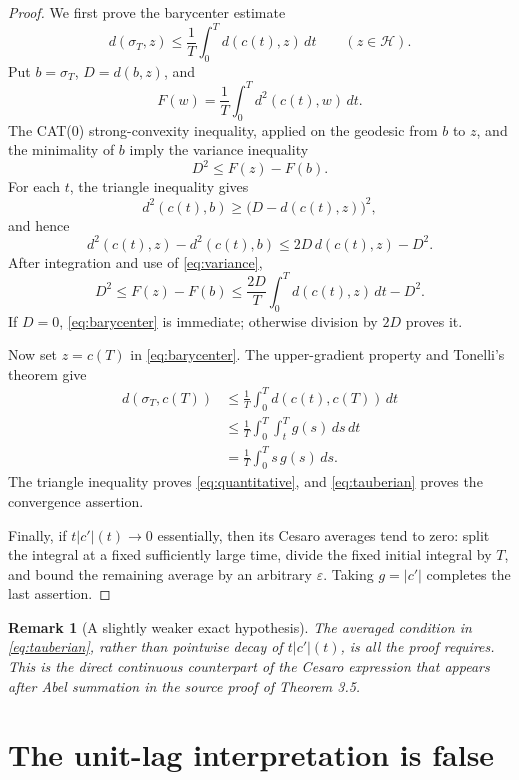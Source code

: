 \documentclass[11pt]{article}
\newtheorem{remark}{Remark}
\newcommand{\Hh}{\mathcal H}
\begin{document}
\begin{proof}
We first prove the barycenter estimate
\begin{equation}\label{eq:barycenter}
 d(\sigma_T,z)\leq\frac1T\int_0^T d(c(t),z)\,dt
 \qquad(z\in\Hh).
\end{equation}
Put $b=\sigma_T$, $D=d(b,z)$, and
\[
 F(w)=\frac1T\int_0^T d^2(c(t),w)\,dt.
\]
The CAT(0) strong-convexity inequality, applied on the geodesic from $b$ to
$z$, and the minimality of $b$ imply the variance inequality
\begin{equation}\label{eq:variance}
 D^2\leq F(z)-F(b).
\end{equation}
For each $t$, the triangle inequality gives
\[
 d^2(c(t),b)\geq
 \bigl(D-d(c(t),z)\bigr)^2,
\]
and hence
\[
 d^2(c(t),z)-d^2(c(t),b)
 \leq 2D\,d(c(t),z)-D^2.
\]
After integration and use of \eqref{eq:variance},
\[
 D^2\leq F(z)-F(b)
 \leq\frac{2D}{T}\int_0^T d(c(t),z)\,dt-D^2.
\]
If $D=0$, \eqref{eq:barycenter} is immediate; otherwise division by $2D$
proves it.

Now set $z=c(T)$ in \eqref{eq:barycenter}.  The upper-gradient property and
Tonelli's theorem give
\begin{align*}
 d(\sigma_T,c(T))
 &\leq\frac1T\int_0^T d(c(t),c(T))\,dt\\
 &\leq\frac1T\int_0^T\int_t^T g(s)\,ds\,dt\\
 &=\frac1T\int_0^T s\,g(s)\,ds.
\end{align*}
The triangle inequality proves \eqref{eq:quantitative}, and
\eqref{eq:tauberian} proves the convergence assertion.

Finally, if $t|c'|(t)\to0$ essentially, then its Cesaro averages tend to
zero: split the integral at a fixed sufficiently large time, divide the
fixed initial integral by $T$, and bound the remaining average by an
arbitrary $\varepsilon$.  Taking $g=|c'|$ completes the last assertion.
\end{proof}

\begin{remark}[A slightly weaker exact hypothesis]
The averaged condition in \eqref{eq:tauberian}, rather than pointwise decay
of $t|c'|(t)$, is all the proof requires.  This is the direct continuous
counterpart of the Cesaro expression that appears after Abel summation in the
source proof of Theorem 3.5.
\end{remark}

\section{The unit-lag interpretation is false}
\end{document}
